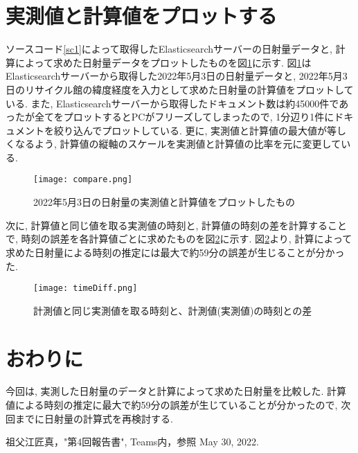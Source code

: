 \documentclass[a4j,12pt,]{jarticle}
\begin{document}
\section{実測値と計算値をプロットする}
ソースコード\ref{sc1}によって取得したElasticsearchサーバーの日射量データと, 計算によって求めた日射量データをプロットしたものを図\ref{p1}に示す.
図\ref{p1}はElasticsearchサーバーから取得した2022年5月3日の日射量データと, 2022年5月3日のリサイクル館の緯度経度を入力として求めた日射量の計算値をプロットしている.
また, Elasticsearchサーバーから取得したドキュメント数は約45000件であったが全てをプロットするとPCがフリーズしてしまったので, 1分辺り1件にドキュメントを絞り込んでプロットしている.
更に, 実測値と計算値の最大値が等しくなるよう, 計算値の縦軸のスケールを実測値と計算値の比率を元に変更している.

\begin{figure}[H]
  \begin{center}
    \texttt{[image: compare.png]}
    \caption{2022年5月3日の日射量の実測値と計算値をプロットしたもの}
    \label{p1}
  \end{center}
\end{figure}

次に, 計算値と同じ値を取る実測値の時刻と, 計算値の時刻の差を計算することで, 時刻の誤差を各計算値ごとに求めたものを図\ref{p2}に示す.
図\ref{p2}より, 計算によって求めた日射量による時刻の推定には最大で約59分の誤差が生じることが分かった.

\begin{figure}[H]
  \begin{center}
    \texttt{[image: timeDiff.png]}
    \caption{計測値と同じ実測値を取る時刻と、計測値(実測値)の時刻との差}
    \label{p2}
  \end{center}
\end{figure}

\section{おわりに}
今回は, 実測した日射量のデータと計算によって求めた日射量を比較した.
計算値による時刻の推定に最大で約59分の誤差が生じていることが分かったので, 次回までに日射量の計算式を再検討する.

\begin{thebibliography}{5}
  祖父江匠真，"第4回報告書", Teams内，参照 May 30, 2022.
\end{thebibliography}
\end{document}
